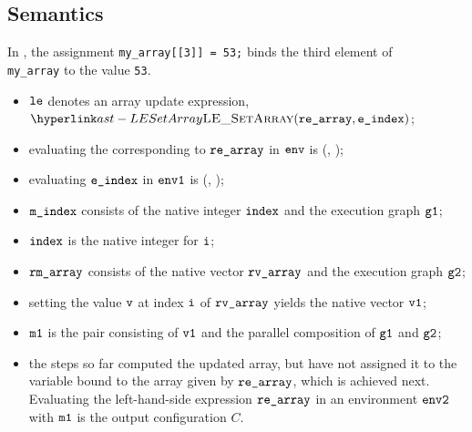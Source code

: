 \subsection{Semantics}
In , the assignment \verb|my_array[[3]] = 53;| binds the third element
of \\
\texttt{my\_array} to the value \texttt{53}.

\ProseParagraph
\AllApply
\begin{itemize}
  \item $\vle$ denotes an array update expression, $\LESetArray(\rearray, \eindex)$;
  \item evaluating the \rhsexpression{} corresponding to $\rearray$ in $\env$
  is \ResultExpr(\rmarray, \envone)\ProseOrAbnormal;
  \item evaluating $\eindex$ in $\envone$ is \ResultExpr(\mindex, \envtwo)\ProseOrAbnormal;
  \item $\mindex$ consists of the native integer $\vindex$ and the execution graph $\vgone$;
  \item $\vindex$ is the native integer for $\vi$;
  \item $\rmarray$ consists of the native vector $\rvarray$ and the execution graph $\vgtwo$;
  \item setting the value $\vv$ at index $\vi$ of $\rvarray$ yields the native vector $\vvone$\ProseOrError;
  \item $\vmone$ is the pair consisting of $\vvone$ and the parallel composition of $\vgone$ and $\vgtwo$;
  \item the steps so far computed the updated array, but have not assigned it to the variable
  bound to the array given by $\rearray$, which is achieved next.
  Evaluating the left-hand-side expression $\rearray$ in an environment $\envtwo$ with $\vmone$
  is the output configuration $C$.
\end{itemize}

\FormallyParagraph
\begin{mathpar}
\end{mathpar}

